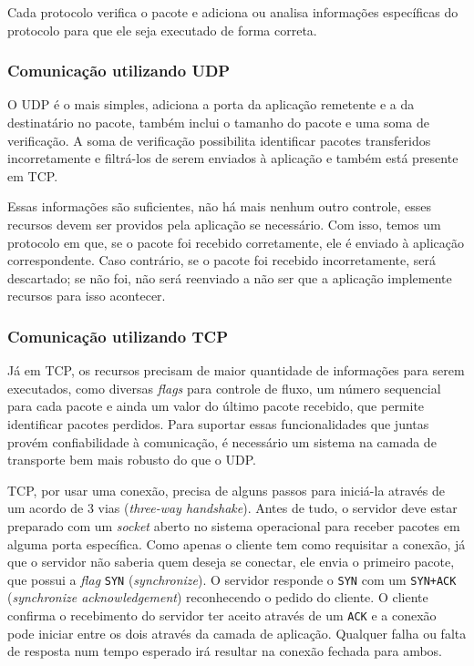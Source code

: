 \documentclass[brazilian,a4paper,twocolumn]{article}
\begin{document}
Cada protocolo verifica o pacote e adiciona ou analisa informações específicas do protocolo para que ele seja executado de forma correta.


\subsubsection{Comunicação utilizando UDP}

O UDP é o mais simples, adiciona a porta da aplicação remetente e a da destinatário no pacote, também inclui o tamanho do pacote e uma soma de verificação. A soma de verificação possibilita identificar pacotes transferidos incorretamente e filtrá-los de serem enviados à aplicação e também está presente em TCP.

Essas informações são suficientes, não há mais nenhum outro controle, esses recursos devem ser providos pela aplicação se necessário. Com isso, temos um protocolo em que, se o pacote foi recebido corretamente, ele é enviado à aplicação correspondente. Caso contrário, se o pacote foi recebido incorretamente, será descartado; se não foi, não será reenviado a não ser que a aplicação implemente recursos para isso acontecer.


\subsubsection{Comunicação utilizando TCP}

Já em TCP, os recursos precisam de maior quantidade de informações para serem executados, como diversas \textit{flags} para controle de fluxo, um número sequencial para cada pacote e ainda um valor do último pacote recebido, que permite identificar pacotes perdidos. Para suportar essas funcionalidades que juntas provém confiabilidade à comunicação, é necessário um sistema na camada de transporte bem mais robusto do que o UDP.

TCP, por usar uma conexão, precisa de alguns passos para iniciá-la através de um acordo de 3 vias (\textit{three-way handshake}). Antes de tudo, o servidor deve estar preparado com um \textit{socket} aberto no sistema operacional para receber pacotes em alguma porta específica. Como apenas o cliente tem como requisitar a conexão, já que o servidor não saberia quem deseja se conectar, ele envia o primeiro pacote, que possui a \textit{flag} \texttt{SYN} (\textit{synchronize}). O servidor responde o \texttt{SYN} com um \texttt{SYN+ACK} (\textit{synchronize acknowledgement}) reconhecendo o pedido do cliente. O cliente confirma o recebimento do servidor ter aceito através de um \texttt{ACK} e a conexão pode iniciar entre os dois através da camada de aplicação. Qualquer falha ou falta de resposta num tempo esperado irá resultar na conexão fechada para ambos.
\end{document}

